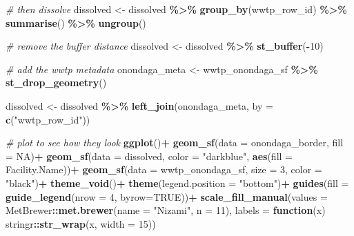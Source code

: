 \documentclass[
]{book}
\newenvironment{Shaded}{\begin{snugshade}}{\end{snugshade}}
\newcommand{\AttributeTok}[1]{\textcolor[rgb]{0.13,0.29,0.53}{#1}}
\newcommand{\CommentTok}[1]{\textcolor[rgb]{0.56,0.35,0.01}{\textit{#1}}}
\newcommand{\ConstantTok}[1]{\textcolor[rgb]{0.56,0.35,0.01}{#1}}
\newcommand{\ControlFlowTok}[1]{\textcolor[rgb]{0.13,0.29,0.53}{\textbf{#1}}}
\newcommand{\DecValTok}[1]{\textcolor[rgb]{0.00,0.00,0.81}{#1}}
\newcommand{\FunctionTok}[1]{\textcolor[rgb]{0.13,0.29,0.53}{\textbf{#1}}}
\newcommand{\NormalTok}[1]{#1}
\newcommand{\OtherTok}[1]{\textcolor[rgb]{0.56,0.35,0.01}{#1}}
\newcommand{\SpecialCharTok}[1]{\textcolor[rgb]{0.81,0.36,0.00}{\textbf{#1}}}
\newcommand{\StringTok}[1]{\textcolor[rgb]{0.31,0.60,0.02}{#1}}
\begin{document}
\begin{Shaded}
\begin{Highlighting}[]
\CommentTok{\# then dissolve}
\NormalTok{dissolved }\OtherTok{\textless{}{-}}\NormalTok{ dissolved }\SpecialCharTok{\%\textgreater{}\%} 
  \FunctionTok{group\_by}\NormalTok{(wwtp\_row\_id) }\SpecialCharTok{\%\textgreater{}\%}
  \FunctionTok{summarise}\NormalTok{() }\SpecialCharTok{\%\textgreater{}\%}
  \FunctionTok{ungroup}\NormalTok{()}

\CommentTok{\# remove the buffer distance}
\NormalTok{dissolved }\OtherTok{\textless{}{-}}\NormalTok{ dissolved }\SpecialCharTok{\%\textgreater{}\%}
  \FunctionTok{st\_buffer}\NormalTok{(}\SpecialCharTok{{-}}\DecValTok{10}\NormalTok{) }

\CommentTok{\# add the wwtp metadata}
\NormalTok{onondaga\_meta }\OtherTok{\textless{}{-}}\NormalTok{ wwtp\_onondaga\_sf }\SpecialCharTok{\%\textgreater{}\%}
  \FunctionTok{st\_drop\_geometry}\NormalTok{() }

\NormalTok{dissolved }\OtherTok{\textless{}{-}}\NormalTok{ dissolved }\SpecialCharTok{\%\textgreater{}\%}
  \FunctionTok{left\_join}\NormalTok{(onondaga\_meta, }\AttributeTok{by =} \FunctionTok{c}\NormalTok{(}\StringTok{"wwtp\_row\_id"}\NormalTok{))}

\CommentTok{\# plot to see how they look}
\FunctionTok{ggplot}\NormalTok{()}\SpecialCharTok{+}
  \FunctionTok{geom\_sf}\NormalTok{(}\AttributeTok{data =}\NormalTok{ onondaga\_border, }\AttributeTok{fill =} \ConstantTok{NA}\NormalTok{)}\SpecialCharTok{+}
  \FunctionTok{geom\_sf}\NormalTok{(}\AttributeTok{data =}\NormalTok{ dissolved, }\AttributeTok{color =} \StringTok{"darkblue"}\NormalTok{, }\FunctionTok{aes}\NormalTok{(}\AttributeTok{fill =} \StringTok{\textasciigrave{}}\AttributeTok{Facility.Name}\StringTok{\textasciigrave{}}\NormalTok{))}\SpecialCharTok{+}
  \FunctionTok{geom\_sf}\NormalTok{(}\AttributeTok{data =}\NormalTok{ wwtp\_onondaga\_sf, }\AttributeTok{size =} \DecValTok{3}\NormalTok{, }\AttributeTok{color =} \StringTok{"black"}\NormalTok{)}\SpecialCharTok{+}
  \FunctionTok{theme\_void}\NormalTok{()}\SpecialCharTok{+}
  \FunctionTok{theme}\NormalTok{(}\AttributeTok{legend.position =} \StringTok{"bottom"}\NormalTok{)}\SpecialCharTok{+}
  \FunctionTok{guides}\NormalTok{(}\AttributeTok{fill =} \FunctionTok{guide\_legend}\NormalTok{(}\AttributeTok{nrow =} \DecValTok{4}\NormalTok{, }\AttributeTok{byrow=}\ConstantTok{TRUE}\NormalTok{))}\SpecialCharTok{+}
  \FunctionTok{scale\_fill\_manual}\NormalTok{(}\AttributeTok{values =}\NormalTok{ MetBrewer}\SpecialCharTok{::}\FunctionTok{met.brewer}\NormalTok{(}\AttributeTok{name =} \StringTok{"Nizami"}\NormalTok{, }\AttributeTok{n =} \DecValTok{11}\NormalTok{),}
                    \AttributeTok{labels =} \ControlFlowTok{function}\NormalTok{(x) stringr}\SpecialCharTok{::}\FunctionTok{str\_wrap}\NormalTok{(x, }\AttributeTok{width =} \DecValTok{15}\NormalTok{))}
\end{Highlighting}
\end{Shaded}
\end{document}
